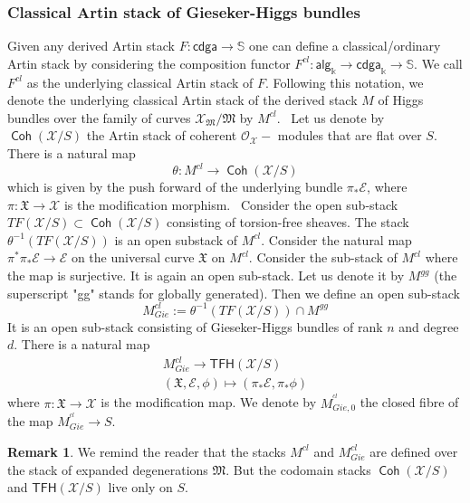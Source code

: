 \documentclass[11pt]{amsart}
\newcommand {\TFH} {\mathsf{TFH}}
\DeclareMathOperator{\Coh}{\mathsf{Coh}}
\theoremstyle{plain}
\numberwithin{equation}{section}
\theoremstyle{definition}
\newtheorem{Rem}[Def]{Remark}
\theoremstyle{plain}
\begin{document}
\smallskip 

\subsubsection{\textbf{Classical Artin stack of Gieseker-Higgs bundles}} \label{class}


Given any derived Artin stack $F: \textsf{cdga} \longrightarrow \mathbb S$ one can define a classical/ordinary Artin stack by considering the composition functor $F^{cl}: \textsf{alg}_{\mathbb k}\longrightarrow \textsf{cdga}_{\mathbb k}\longrightarrow \mathbb S$. We call $F^{cl}$ as the underlying classical Artin stack of $F$. Following this notation, we denote the underlying classical Artin stack of the derived stack $M$ of Higgs bundles over the family of curves $\mathcal X_{\mathfrak M}/\mathfrak M$ by $M^{cl}$.
\
Let us denote by $\Coh(\mathcal X/S)$ the Artin stack of coherent $\mathcal O_{\mathcal X}-$ modules that are flat over $S$. There is a natural map
$$\theta: M^{cl}\longrightarrow \Coh(\mathcal X/S)$$
which is given by the push forward of the underlying bundle $\pi_*\mathcal E$, where $\pi: \mathfrak X\longrightarrow \mathcal X$ is the modification morphism.
\
Consider the open sub-stack $TF(\mathcal X/S)\subset \Coh(\mathcal X/S)$ consisting of torsion-free sheaves. The stack $\theta^{-1}(TF(\mathcal X/S))$ is an open substack of $M^{cl}$. Consider the natural map $\pi^*\pi_*\mathcal E\longrightarrow \mathcal E$ on the universal curve $\mathfrak X$ on $M^{cl}$. Consider the sub-stack of $M^{cl}$ where the map is surjective. It is again an open sub-stack. Let us denote it by $M^{gg}$ (the superscript "gg" stands for globally generated). Then we define an open sub-stack
$$M^{cl}_{Gie}:=\theta^{-1}(TF(\mathcal X/S))\cap M^{gg}$$
It is an open sub-stack consisting of Gieseker-Higgs bundles of rank $n$ and degree $d$. There is a natural map
\begin{align}\label{pushforward112}
M^{cl}_{Gie}\longrightarrow \TFH(\mathcal X/S)\\
(\mathfrak X, \mathcal E, \phi)\mapsto (\pi_*\mathcal E, \pi_*\phi)
\end{align}
where $\pi: \mathfrak X\longrightarrow \mathcal X$ is the modification map. We denote by $M^{^{cl}}_{Gie,0}$ the closed fibre of the map $M^{^{cl}}_{Gie}\longrightarrow S$.
\begin{Rem}
    We remind the reader that the stacks $M^{cl}$ and $M^{cl}_{Gie}$ are defined over the stack of expanded degenerations $\mathfrak M$. But the codomain stacks $\Coh(\mathcal X/S)$ and $\TFH(\mathcal X/S)$ live only on $S$.
\end{Rem}
\end{document}
